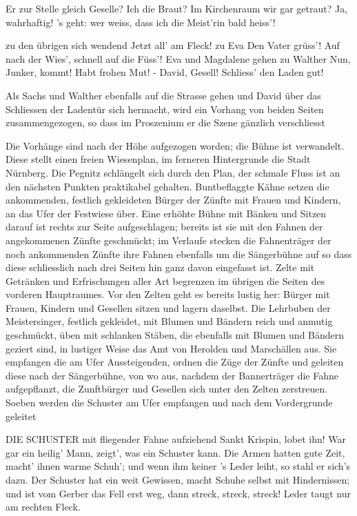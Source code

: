 \begin{drama}
\Magdalenespeaks
Er zur Stelle gleich Geselle?
Ich die Braut?
Im Kirchenraum wir gar getraut?
Ja, wahrhaftig! 's geht:
wer weiss,
dass ich die Meist'rin bald heiss'!

\Sachsspeaks
zu den übrigen sich wendend
Jetzt all' am Fleck!
zu Eva
Den Vater grüss'!
Auf nach der Wies', schnell auf die Füss'!
Eva und Magdalene gehen
zu Walther
Nun, Junker, kommt! Habt frohen Mut! -
David, Gesell! Schliess' den Laden gut!

Als Sachs und Walther ebenfalls auf die Strasse gehen und David über das Schliessen der Ladentür sich hermacht, wird ein Vorhang von beiden Seiten zusammengezogen, so dass im Proszenium er die Szene gänzlich verschliesst


\scene

Die Vorhänge sind nach der Höhe aufgezogen worden; die Bühne ist verwandelt. Diese stellt einen freien Wiesenplan, im ferneren Hintergrunde die Stadt Nürnberg. Die Pegnitz schlängelt sich durch den Plan, der schmale Fluss ist an den nächsten Punkten praktikabel gehalten. Buntbeflaggte Kähne setzen die ankommenden, festlich gekleideten Bürger der Zünfte mit Frauen und Kindern, an das Ufer der Festwiese über. Eine erhöhte Bühne mit Bänken und Sitzen darauf ist rechts zur Seite aufgeschlagen; bereits ist sie mit den Fahnen der angekommenen Zünfte geschmückt; im Verlaufe stecken die Fahnenträger der noch ankommenden Zünfte ihre Fahnen ebenfalls um die Sängerbühne auf so dass diese schliesslich nach drei Seiten hin ganz davon eingefasst ist. Zelte mit Getränken und Erfrischungen aller Art begrenzen im übrigen die Seiten des vorderen Hauptraumes. Vor den Zelten geht es bereits lustig her: Bürger mit Frauen, Kindern und Gesellen sitzen und lagern daselbst. Die Lehrbuben der Meistersinger, festlich gekleidet, mit Blumen und Bändern reich und anmutig geschmückt, üben mit schlanken Stäben, die ebenfalls mit Blumen und Bändern geziert sind, in lustiger Weise das Amt von Herolden und Marschällen aus. Sie empfangen die am Ufer Aussteigenden, ordnen die Züge der Zünfte und geleiten diese nach der Sängerbühne, von wo aus, nachdem der Bannerträger die Fahne aufgepflanzt, die Zunftbürger und Gesellen sich unter den Zelten zerstreuen. Soeben werden die Schuster am Ufer empfangen und nach dem Vordergrunde geleitet

DIE SCHUSTER
mit fliegender Fahne aufziehend
Sankt Krispin, lobet ihn!
War gar ein heilig' Mann,
zeigt', was ein Schuster kann.
Die Armen hatten gute Zeit,
macht' ihnen warme Schuh';
und wenn ihm keiner 's Leder leiht,
so stahl er sich's dazu.
Der Schuster hat ein weit Gewissen,
macht Schuhe selbst mit Hindernissen;
und ist vom Gerber das Fell erst weg,
dann streck, streck, streck!
Leder taugt nur am rechten Fleck.


\end{drama}
